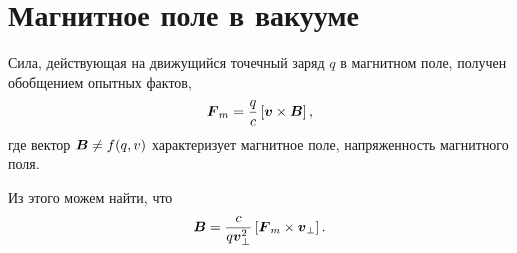 \section{Магнитное поле в вакууме}


\begin{to_law} 
    Сила, действующая на движущийся точечный заряд $q$ в магнитном поле, получен обобщением опытных фактов,
    \begin{equation}
         \mbox{\boldmath $F$}_m = \frac{q}{c} \left[\mbox{\boldmath $v$} \times \mbox{\boldmath $B$}\right],
     \end{equation} 
    где вектор $\mbox{\boldmath $B$} \neq f(q, v)$ характеризует магнитное поле, напряженность магнитного поля.
\end{to_law}

Из этого можем найти, что
$$
    \mbox{\boldmath $B$} = \frac{c}{q \mbox{\boldmath $v$}^2_{\bot}} \left[
        \mbox{\boldmath $F$}_m \times \mbox{\boldmath $v$}_{\bot}
    \right].
$$

